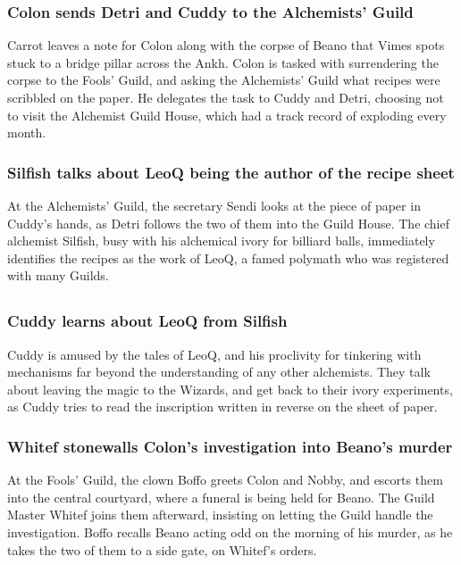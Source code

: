 \subsubsection{\Gls{Colon} sends \Gls{Detri} and \Gls{Cuddy} to the Alchemists' Guild}
\Gls{Carrot} leaves a note for \Gls{Colon} along with the corpse of \Gls{Beano} that \Gls{Vimes}
spots stuck to a bridge pillar across the Ankh. \Gls{Colon} is tasked with surrendering the corpse
to the Fools' Guild, and asking the Alchemists' Guild what recipes were scribbled on the paper.
He delegates the task to \Gls{Cuddy} and \Gls{Detri}, choosing not to visit the Alchemist Guild
House, which had a track record of exploding every month.

\subsubsection{\Gls{Silfish} talks about \Gls{LeoQ} being the author of the recipe sheet}
At the Alchemists' Guild, the secretary \Gls{Sendi} looks at the piece of paper in \Gls{Cuddy}'s
hands, as \Gls{Detri} follows the two of them into the Guild House. The chief alchemist
\Gls{Silfish}, busy with his alchemical ivory for billiard balls, immediately identifies the
recipes as the work of \Gls{LeoQ}, a famed polymath who was registered with many Guilds.

\subsection{}
\subsubsection{\Gls{Cuddy} learns about \Gls{LeoQ} from \Gls{Silfish}}
\Gls{Cuddy} is amused by the tales of \Gls{LeoQ}, and his proclivity for tinkering with mechanisms
far beyond the understanding of any other alchemists. They talk about leaving the magic to the
Wizards, and get back to their ivory experiments, as \Gls{Cuddy} tries to read the inscription
written in reverse on the sheet of paper.

\subsubsection{\Gls{Whitef} stonewalls \Gls{Colon}'s investigation into \Gls{Beano}'s murder}
At the Fools' Guild, the clown \Gls{Boffo} greets \Gls{Colon} and \Gls{Nobby}, and escorts them into
the central courtyard, where a funeral is being held for \Gls{Beano}. The Guild Master \Gls{Whitef}
joins them afterward, insisting on letting the Guild handle the investigation. \Gls{Boffo} recalls
\Gls{Beano} acting odd on the morning of his murder, as he takes the two of them to a side gate, on
\Gls{Whitef}'s orders.

